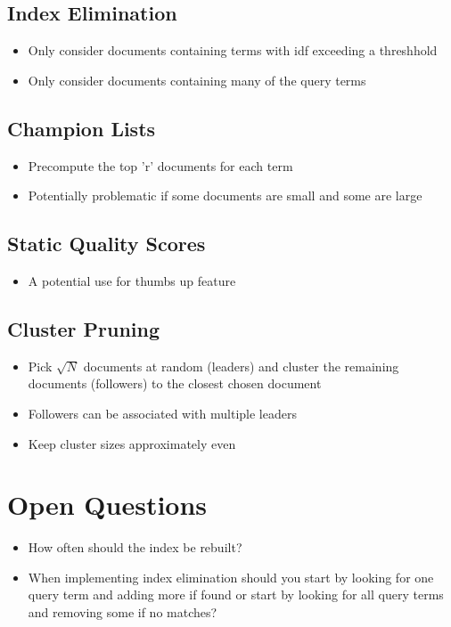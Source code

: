 \documentclass{article}
\begin{document}
\subsection{Index Elimination}
\begin{itemize}
	\item Only consider documents containing terms with idf exceeding a threshhold
	\item Only consider documents containing many of the query terms
\end{itemize}{}
\subsection{Champion Lists}
\begin{itemize}
	\item Precompute the top 'r' documents for each term
	\item Potentially problematic if some documents are small and some are large
\end{itemize}{}
\subsection{Static Quality Scores}
\begin{itemize}
	\item A potential use for thumbs up feature
\end{itemize}{}
\subsection{Cluster Pruning}
\begin{itemize}
	\item Pick $\sqrt{N}$ documents at random (leaders) and cluster the remaining documents (followers) to the closest chosen document
	\item Followers can be associated with multiple leaders
	\item Keep cluster sizes approximately even
\end{itemize}{}

\section{Open Questions}
\begin{itemize}
	\item How often should the index be rebuilt?
    \item When implementing index elimination should you start by looking for one query term and adding more if found or start by looking for all query terms and removing some if no matches?
\end{itemize}{}
\end{document}
